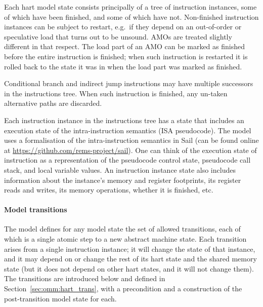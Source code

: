 Each hart model state consists principally of a tree of instruction instances, some of which have been finished, and some of which have not.
Non-finished instruction instances can be subject to restart, e.g.~if they depend on an out-of-order or speculative load that turns out to be unsound.
AMOs are treated slightly different in that respect.
The load part of an AMO can be marked as finished before the entire instruction is finished; when such instruction is restarted it is rolled back to the state it was in when the load part was marked as finished.

Conditional branch and indirect jump instructions may have multiple successors in the instructions tree.
When such instruction is finished, any un-taken alternative paths are discarded.

Each instruction instance in the instructions tree has a state that includes an execution state of the intra-instruction semantics (ISA pseudocode).
The model uses a formalisation of the intra-instruction semantics in Sail (can be found online at \url{https://github.com/rems-project/sail}).
One can think of the execution state of instruction as a representation of the pseudocode control state, pseudocode call stack, and local variable values.
An instruction instance state also includes information about the instance's memory and register footprints, its register reads and writes, its memory operations, whether it is finished, etc.

\paragraph{Model transitions}
The model defines for any model state the set of allowed transitions, each of which is a single atomic step to a new abstract machine state.
Each transition arises from a single instruction instance; it will change the state of that instance, and it may depend on or change the rest of its hart state and the shared memory state (but it does not depend on other hart states, and it will not change them).
The transitions are introduced below and defined in Section~\ref{sec:omm:hart_trans}, with a precondition and a construction of the post-transition model state for each.

